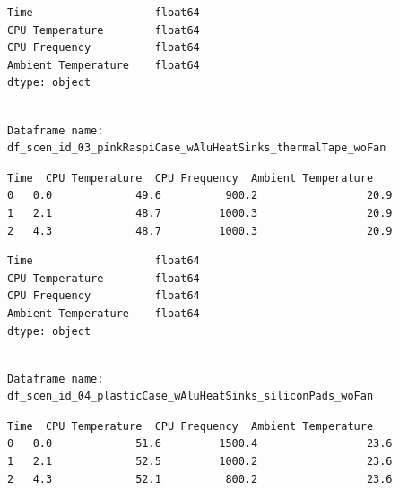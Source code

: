 \documentclass[10pt,parskip=half,
toc=sectionentrywithdots,
bibliography=totocnumbered,
captions=tableheading,numbers=noendperiod]{scrartcl}
\begin{document}
\begin{lstlisting}[language={},postbreak={},numbers=none,xrightmargin=7pt,breakindent=0pt,aboveskip=5pt,belowskip=5pt]
Time                   float64
CPU Temperature        float64
CPU Frequency          float64
Ambient Temperature    float64
dtype: object
\end{lstlisting}

\begin{lstlisting}[language={},postbreak={},numbers=none,xrightmargin=7pt,belowskip=5pt,aboveskip=5pt,breakindent=0pt]

Dataframe name: df_scen_id_03_pinkRaspiCase_wAluHeatSinks_thermalTape_woFan

\end{lstlisting}

\begin{lstlisting}[language={},postbreak={},numbers=none,xrightmargin=7pt,breakindent=0pt,aboveskip=5pt,belowskip=5pt]
   Time  CPU Temperature  CPU Frequency  Ambient Temperature
0   0.0             49.6          900.2                 20.9
1   2.1             48.7         1000.3                 20.9
2   4.3             48.7         1000.3                 20.9
\end{lstlisting}

\begin{lstlisting}[language={},postbreak={},numbers=none,xrightmargin=7pt,breakindent=0pt,aboveskip=5pt,belowskip=5pt]
Time                   float64
CPU Temperature        float64
CPU Frequency          float64
Ambient Temperature    float64
dtype: object
\end{lstlisting}

\begin{lstlisting}[language={},postbreak={},numbers=none,xrightmargin=7pt,belowskip=5pt,aboveskip=5pt,breakindent=0pt]

Dataframe name: df_scen_id_04_plasticCase_wAluHeatSinks_siliconPads_woFan

\end{lstlisting}

\begin{lstlisting}[language={},postbreak={},numbers=none,xrightmargin=7pt,breakindent=0pt,aboveskip=5pt,belowskip=5pt]
   Time  CPU Temperature  CPU Frequency  Ambient Temperature
0   0.0             51.6         1500.4                 23.6
1   2.1             52.5         1000.2                 23.6
2   4.3             52.1          800.2                 23.6
\end{lstlisting}
\end{document}
